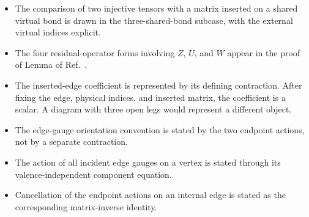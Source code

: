 \documentclass{article}
\begin{document}
\begin{itemize}
\item
The comparison of two injective tensors with a matrix inserted on a shared
virtual bond is drawn in the three-shared-bond subcase, with the external
virtual indices explicit.

\item
The four residual-operator forms involving $Z$, $U$, and $W$ appear in the
proof of Lemma  of
Ref.~\cite{Molnar2018NormalPEPS}.

\item
The inserted-edge coefficient is represented by its defining contraction.
After fixing the edge, physical indices, and inserted matrix, the coefficient
is a scalar. A diagram with three open legs would represent a different object.

\item
The edge-gauge orientation convention is stated by the two endpoint actions,
not by a separate contraction.

\item
The action of all incident edge gauges on a vertex is stated through its
valence-independent component equation.

\item
Cancellation of the endpoint actions on an internal edge is stated as the
corresponding matrix-inverse identity.


\end{itemize}
\end{document}

